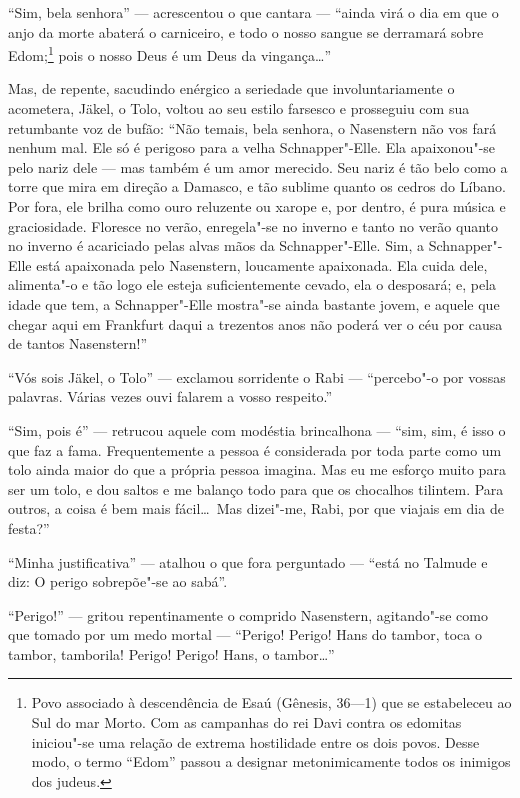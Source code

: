 ``Sim, bela senhora'' --- acrescentou o que cantara --- ``ainda virá o dia em
que o anjo da morte abaterá o carniceiro, e todo o nosso sangue se
derramará sobre
Edom;\footnote{ Povo
associado à descendência de Esaú (Gênesis, 36---1) que se estabeleceu
ao Sul do mar Morto. Com as campanhas do rei Davi contra os edomitas
iniciou"-se uma relação de extrema hostilidade entre os dois povos.
Desse modo, o termo ``Edom'' passou a designar metonimicamente todos os
inimigos dos judeus.}
 pois o nosso Deus é um Deus da vingança\ldots''

Mas, de repente, sacudindo enérgico a seriedade que involuntariamente o
acometera, Jäkel, o Tolo, voltou ao seu estilo farsesco e prosseguiu
com sua retumbante voz de bufão: ``Não temais, bela senhora, o
Nasenstern não vos fará nenhum mal. Ele só é perigoso para a velha
Schnapper"-Elle. Ela apaixonou"-se pelo nariz dele --- mas também é um
amor merecido. Seu nariz é tão belo como a torre que mira em direção a
Damasco, e tão sublime quanto os cedros do Líbano. Por fora, ele brilha
como ouro reluzente ou xarope e, por dentro, é pura música e
graciosidade. Floresce no verão, enregela"-se no inverno e tanto no
verão quanto no inverno é acariciado pelas alvas mãos da
Schnapper"-Elle. Sim, a Schnapper"-Elle está apaixonada pelo
Nasenstern, loucamente apaixonada. Ela cuida dele, alimenta"-o e tão
logo ele esteja suficientemente cevado, ela o desposará; e, pela idade
que tem, a Schnapper"-Elle mostra"-se ainda bastante jovem, e aquele
que chegar aqui em Frankfurt daqui a trezentos anos não poderá ver o
céu por causa de tantos Nasenstern!''

``Vós sois Jäkel, o Tolo'' --- exclamou sorridente o Rabi --- ``percebo"-o por
vossas palavras. Várias vezes ouvi falarem a vosso respeito.''

``Sim, pois é'' --- retrucou aquele com modéstia brincalhona --- ``sim, sim, é
isso o que faz a fama. Frequentemente a pessoa é considerada por toda
parte como um tolo ainda maior do que a própria pessoa imagina. Mas eu
me esforço muito para ser um tolo, e dou saltos e me balanço todo para
que os chocalhos tilintem. Para outros, a coisa é bem mais fácil\ldots\ Mas
dizei"-me, Rabi, por que viajais em dia de festa?''

``Minha justificativa'' --- atalhou o que fora perguntado --- ``está no Talmude
e diz: O perigo sobrepõe"-se ao sabá''.

``Perigo!'' --- gritou repentinamente o comprido Nasenstern, agitando"-se
como que tomado por um medo mortal --- ``Perigo! Perigo! Hans do tambor,
toca o tambor, tamborila! Perigo! Perigo! Hans, o tambor\ldots''


